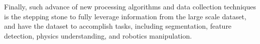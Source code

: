
Finally, such advance of new processing algorithms and data collection techniques is the stepping stone to fully leverage information from the large scale dataset, and have the dataset to accomplish tasks, including segmentation, feature detection, physics understanding, and robotics manipulation.
